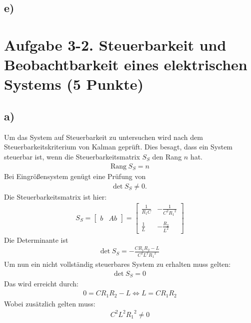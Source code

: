 \documentclass[11pt]{scrartcl} %
\begin{document}
\subsection*{e)}


\section*{Aufgabe 3-2. Steuerbarkeit und Beobachtbarkeit eines elektrischen Systems (5 Punkte)}
\subsection*{a)}
Um das System auf Steuerbarkeit zu untersuchen wird nach dem Steuerbarkeitskriterium von Kalman geprüft. Dies besagt, dass ein System steuerbar ist, wenn die Steuerbarkeitsmatrix $S_S$ den Rang $n$ hat.
\begin{align*}
\text{Rang} \hspace{3pt} S_S = n
\end{align*}
Bei Eingrößensystem genügt eine Prüfung von
\begin{align*}
\text{det} \hspace{3pt} S_S \neq 0.
\end{align*}
Die Steuerbarkeitsmatrix ist hier:
\begin{align*}
S_S=\begin{bmatrix}
b & Ab
\end{bmatrix} =
\begin{bmatrix}
\frac{1}{R_1C} & -\frac{1}{C^2{R_1}^2} \\\\
\frac{1}{L} & -\frac{R_2}{L^2}
\end{bmatrix}
\end{align*}
Die Determinante ist
\begin{align*}
\text{det} \hspace{3pt} S_S=-\frac{CR_1R_2-L}{C^2L^2{R_1}^2}
\end{align*}
Um nun ein nicht vollständig steuerbares System zu erhalten muss gelten:
\begin{align*}
\text{det} \hspace{3pt} S_S=0
\end{align*}
Das wird erreicht durch:
\begin{align*}
0=CR_1R_2-L\Leftrightarrow L=CR_1R_2
\end{align*}
Wobei zusätzlich gelten muss:
\begin{align*}
C^2L^2{R_1}^2 \neq 0
\end{align*}
\end{document}
